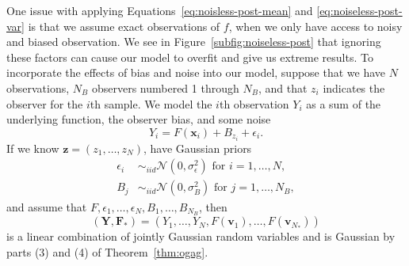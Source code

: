 One issue with applying Equations~\ref{eq:noisless-post-mean} and \ref{eq:noiseless-post-var} is that we assume exact observations of $f$, when we only have access to noisy and biased observation.
We see in Figure~\ref{subfig:noiseless-post} that ignoring these factors can cause our model to overfit and give us extreme results.
To incorporate the effects of bias and noise into our model, suppose that we have $N$ observations, $N_B$ observers numbered 1 through $N_B$, and that $z_i$ indicates the observer for the $i$th sample.
We model the $i$th observation $Y_i$ as a sum of the underlying function, the observer bias, and some noise
\begin{equation*}
    Y_i = F(\mathbf{x}_i) + B_{z_i} + \epsilon_i.
\end{equation*}
If we know $\mathbf{z} = (z_1, \dots, z_N)$, have Gaussian priors
\begin{align*}
    \epsilon_i & \sim_{iid} \mathcal{N}\left(0, \sigma^2_{\epsilon}\right) \text{ for $i = 1, \dots, N$}, \\
    B_j & \sim_{iid} \mathcal{N}\left(0, \sigma_{B}^2\right) \text{ for $j = 1, \dots, N_B$},
\end{align*}
and assume that $F, \epsilon_1, \dots, \epsilon_N, B_1, \dots, B_{N_B}$, then
\begin{equation*}
    (\mathbf{Y}, \mathbf{F}_*) = (Y_1, \dots, Y_N, F(\mathbf{v}_1), \dots, F(\mathbf{v}_{N_*}))
\end{equation*}
is a linear combination of jointly Gaussian random variables
and is Gaussian by parts (3) and (4) of Theorem~\ref{thm:ogag}.

